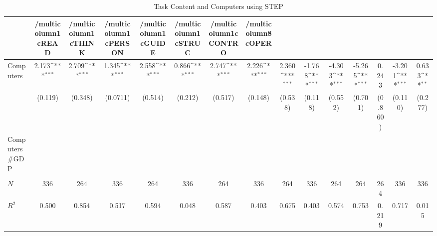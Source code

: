 \begin{table}[htbp]\centering
\def\sym#1{\ifmmode^{#1}\else\(^{#1}\)\fi}
\caption{Task Content and Computers using STEP}
\begin{tabular}{l*{14}{c}}
\hline\hline
            &/multicolumn{1}{c}{READ}&/multicolumn{1}{c}{THINK}&/multicolumn{1}{c}{PERSON}&/multicolumn{1}{c}{GUIDE}&/multicolumn{1}{c}{STRUC}&/multicolumn{1}{c}{CONTRO}&/multicolumn{8}{c}{OPER}                                                                                                                                                       \\
\hline
Computers   &       2.173\sym{***}&       2.709\sym{***}&       1.345\sym{***}&       2.558\sym{***}&       0.866\sym{***}&       2.747\sym{***}&       2.226\sym{***}&       2.360\sym{***}&      -1.768\sym{***}&      -4.303\sym{***}&      -5.265\sym{***}&       0.243         &      -3.201\sym{***}&       0.633\sym{**} \\
            &     (0.119)         &     (0.348)         &    (0.0711)         &     (0.514)         &     (0.212)         &     (0.517)         &     (0.148)         &     (0.538)         &     (0.118)         &     (0.552)         &     (0.701)         &     (0.860)         &     (0.110)         &     (0.277)         \\
[1em]
Computers#GDP&                     &                     &                     &                     &                     &                     &                     &                     &                     &                     &                     &                     &                     &                     \\
            &                     &                     &                     &                     &                     &                     &                     &                     &                     &                     &                     &                     &                     &                     \\
\hline
\(N\)       &         336         &         264         &         336         &         264         &         336         &         264         &         336         &         264         &         336         &         264         &         264         &         264         &         336         &         336         \\
\(R^{2}\)   &       0.500         &       0.854         &       0.517         &       0.594         &       0.048         &       0.587         &       0.403         &       0.675         &       0.403         &       0.574         &       0.753         &       0.219         &       0.717         &       0.015         \\
\hline\hline
\end{tabular}
\end{table}
